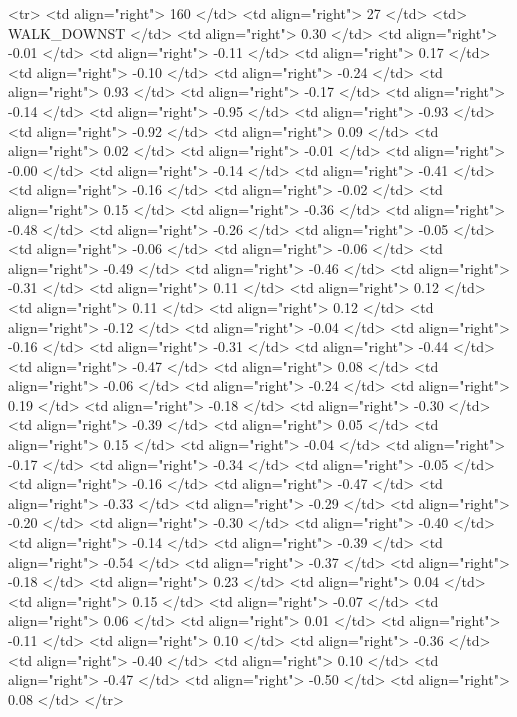   <tr> <td align="right"> 160 </td> <td align="right">  27 </td> <td> WALK_DOWNST </td> <td align="right"> 0.30 </td> <td align="right"> -0.01 </td> <td align="right"> -0.11 </td> <td align="right"> 0.17 </td> <td align="right"> -0.10 </td> <td align="right"> -0.24 </td> <td align="right"> 0.93 </td> <td align="right"> -0.17 </td> <td align="right"> -0.14 </td> <td align="right"> -0.95 </td> <td align="right"> -0.93 </td> <td align="right"> -0.92 </td> <td align="right"> 0.09 </td> <td align="right"> 0.02 </td> <td align="right"> -0.01 </td> <td align="right"> -0.00 </td> <td align="right"> -0.14 </td> <td align="right"> -0.41 </td> <td align="right"> -0.16 </td> <td align="right"> -0.02 </td> <td align="right"> 0.15 </td> <td align="right"> -0.36 </td> <td align="right"> -0.48 </td> <td align="right"> -0.26 </td> <td align="right"> -0.05 </td> <td align="right"> -0.06 </td> <td align="right"> -0.06 </td> <td align="right"> -0.49 </td> <td align="right"> -0.46 </td> <td align="right"> -0.31 </td> <td align="right"> 0.11 </td> <td align="right"> 0.12 </td> <td align="right"> 0.11 </td> <td align="right"> 0.12 </td> <td align="right"> -0.12 </td> <td align="right"> -0.04 </td> <td align="right"> -0.16 </td> <td align="right"> -0.31 </td> <td align="right"> -0.44 </td> <td align="right"> -0.47 </td> <td align="right"> 0.08 </td> <td align="right"> -0.06 </td> <td align="right"> -0.24 </td> <td align="right"> 0.19 </td> <td align="right"> -0.18 </td> <td align="right"> -0.30 </td> <td align="right"> -0.39 </td> <td align="right"> 0.05 </td> <td align="right"> 0.15 </td> <td align="right"> -0.04 </td> <td align="right"> -0.17 </td> <td align="right"> -0.34 </td> <td align="right"> -0.05 </td> <td align="right"> -0.16 </td> <td align="right"> -0.47 </td> <td align="right"> -0.33 </td> <td align="right"> -0.29 </td> <td align="right"> -0.20 </td> <td align="right"> -0.30 </td> <td align="right"> -0.40 </td> <td align="right"> -0.14 </td> <td align="right"> -0.39 </td> <td align="right"> -0.54 </td> <td align="right"> -0.37 </td> <td align="right"> -0.18 </td> <td align="right"> 0.23 </td> <td align="right"> 0.04 </td> <td align="right"> 0.15 </td> <td align="right"> -0.07 </td> <td align="right"> 0.06 </td> <td align="right"> 0.01 </td> <td align="right"> -0.11 </td> <td align="right"> 0.10 </td> <td align="right"> -0.36 </td> <td align="right"> -0.40 </td> <td align="right"> 0.10 </td> <td align="right"> -0.47 </td> <td align="right"> -0.50 </td> <td align="right"> 0.08 </td> </tr>
